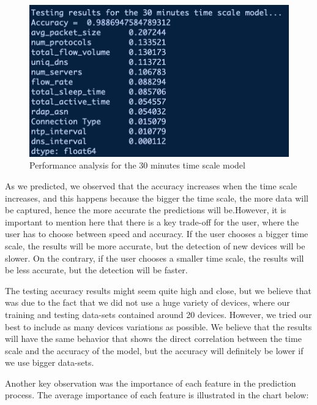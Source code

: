 \documentclass{article}
\begin{document}
\begin{figure}[!ht]
    \centering
    \includegraphics[width=13cm]{ML2graphs/30minperformance.png}
    \caption{Performance analysis for the 30 minutes time scale model} 
\end{figure}
\pagebreak
As we predicted, we observed that the accuracy increases when the time scale increases, and this happens because the bigger the time scale, the more data will be captured, hence the more accurate the predictions will be.\newline However, it is important to mention here that there is a key trade-off for the user, where the user has to choose between speed and accuracy. If the user chooses a bigger time scale, the results will be more accurate, but the detection of new devices will be slower. On the contrary, if the user chooses a smaller time scale, the results will be less accurate, but the detection will be faster. \newline

The testing accuracy results might seem quite high and close, but we believe that was due to the fact that we did not use a huge variety of devices, where our training and testing data-sets contained around 20 devices. However, we tried our best to include as many devices variations as possible. We believe that the results will have the same behavior that shows the direct correlation between the time scale and the accuracy of the model, but the accuracy will definitely be lower if we use bigger data-sets.\newline

Another key observation was the importance of each feature in the prediction process. The average importance of each feature is illustrated in the chart below: \newline
\end{document}
